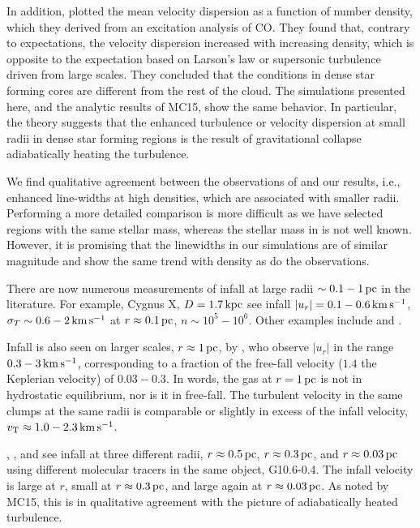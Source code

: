 \documentclass[../dissertation.tex]{subfiles}
\begin{document}
%
In addition, \citet{1997ApJ...476..730P} plotted the mean velocity 
dispersion as a function of number density, which they derived 
from an excitation analysis of CO. 
They found that, contrary to expectations, the velocity dispersion increased with increasing density, 
which is opposite to the expectation based on Larson's law or supersonic turbulence driven from large scales. 
They concluded that the conditions in dense star forming cores 
are different from the rest of the cloud. The simulations presented here, and the 
analytic results of MC15, show the same behavior. In particular, the theory suggests 
that the enhanced turbulence or velocity dispersion at small radii in dense star 
forming regions is the result of gravitational collapse adiabatically heating the 
turbulence. 


We find qualitative agreement between the observations of \citet{1997ApJ...476..730P} 
and our results, i.e., enhanced line-widths at high 
densities, which are associated with smaller radii.
Performing a more detailed 
comparison is more difficult as we have selected regions with the same stellar 
mass, whereas the stellar mass in \citet{1997ApJ...476..730P} is not well known.  
However, it is promising that the linewidths in our simulations are of similar 
magnitude and show the same trend with density as do the observations.

There are now numerous measurements of infall at large radii $\sim 0.1-1\,\rm pc$ 
in the literature. For example, \citet{2011A&A...527A.135C} Cygnus X, 
$D=1.7\,\rm kpc$ see infall $|u_r|=0.1-0.6\,\rm km\,s^{-1}$, $\sigma_T\sim 0.6-2\,\rm km\,s^{-1}$ at  
$r\approx 0.1\,\rm pc$, $n\sim 10^5-10^6$. Other examples include \citet{2012ApJ...746..174R,2015A&A...573A.119R} and 
\citet{2013A&A...555A.112P}. 

Infall is also seen on larger scales, $r\approx1\,\rm pc$, by \citet{2016A&A...585A.149W}, who observe $|u_r|$ in the range $0.3-3\,\rm km\,s^{-1}$, corresponding to a fraction of the free-fall velocity ($1.4$ the Keplerian velocity) of $0.03-0.3$. In words, the gas at $r=1\,\rm pc$ is not in hydrostatic equilibrium, nor is it in free-fall. The turbulent velocity in the same clumps at the same radii is comparable or slightly in excess of the infall velocity, $v_{\rm T}\approx 1.0-2.3\,\rm km\,s^{-1}$.

\citet{1986ApJ...304..501H}, \citet{2008ApJ...684.1273K}, and 
\citet{2011A&A...530A..53K} see infall at three different radii, 
$r\approx 0.5\,\rm pc$, $r\approx 0.3\,\rm pc$, and $r\approx 0.03\,\rm pc$ using 
different molecular tracers in the same object, G10.6-0.4. The infall velocity
is large at $r$, small at $r\approx 0.3\,\rm pc$, and large again at $r\approx 0.03\,\rm pc$. 
As noted by MC15, this is in qualitative agreement with the
picture of adiabatically heated turbulence. 
\end{document}
